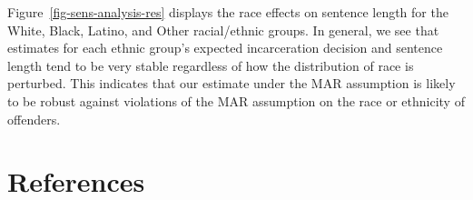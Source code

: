 \documentclass[
  letterpaper,
  DIV=11,
  numbers=noendperiod]{scrartcl}
\begin{document}
Figure~\ref{fig-sens-analysis-res} displays the race effects on sentence
length for the White, Black, Latino, and Other racial/ethnic groups. In
general, we see that estimates for each ethnic group's expected
incarceration decision and sentence length tend to be very stable
regardless of how the distribution of race is perturbed. This indicates
that our estimate under the MAR assumption is likely to be robust
against violations of the MAR assumption on the race or ethnicity of
offenders.

\newpage

\hypertarget{references}{%
\section*{References}\label{references}}
\end{document}
